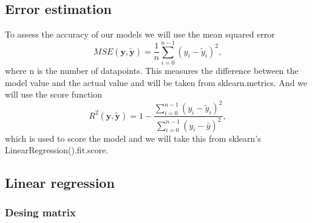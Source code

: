 \subsection{Error estimation}
To assess the accuracy of our models we will use the mean squared error
$$
MSE(\boldsymbol{y},\tilde{\boldsymbol{y}}) = \frac{1}{n}
\sum_{i=0}^{n-1}(y_i-\tilde{y}_i)^2,
$$
where n is the number of datapoints. This measures the difference between the model value and the actual value and will be taken from sklearn.metrics. And we will use the score function
$$
R^2(\boldsymbol{y}, \tilde{\boldsymbol{y}}) = 1 - \frac{\sum_{i=0}^{n - 1} (y_i - \tilde{y}_i)^2}{\sum_{i=0}^{n - 1} (y_i - \bar{y})^2},
$$
which is used to score the model and we will take this from sklearn's LinearRegression().fit.score.

\subsection{Linear regression}
\subsubsection{Desing matrix}

